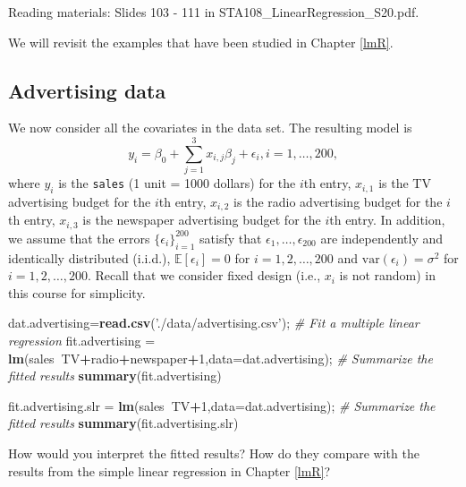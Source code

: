 \documentclass[12pt,]{book}
\newenvironment{Shaded}{\begin{snugshade}}{\end{snugshade}}
\newcommand{\KeywordTok}[1]{\textcolor[rgb]{0.13,0.29,0.53}{\textbf{#1}}}
\newcommand{\DataTypeTok}[1]{\textcolor[rgb]{0.13,0.29,0.53}{#1}}
\newcommand{\DecValTok}[1]{\textcolor[rgb]{0.00,0.00,0.81}{#1}}
\newcommand{\StringTok}[1]{\textcolor[rgb]{0.31,0.60,0.02}{#1}}
\newcommand{\CommentTok}[1]{\textcolor[rgb]{0.56,0.35,0.01}{\textit{#1}}}
\newcommand{\OperatorTok}[1]{\textcolor[rgb]{0.81,0.36,0.00}{\textbf{#1}}}
\newcommand{\NormalTok}[1]{#1}
\begin{document}
Reading materials: Slides 103 - 111 in
STA108\_LinearRegression\_S20.pdf.

We will revisit the examples that have been studied in Chapter
\ref{lmR}.

\subsection{Advertising data}\label{advertising-data-1}

We now consider all the covariates in the data set. The resulting model
is \[
    y_i =  \beta_0 + \sum_{j=1}^3 x_{i,j} \beta_j  +  \epsilon_i, i=1,\ldots, 200,
    \] where \(y_i\) is the \texttt{sales} (1 unit = 1000 dollars) for
the \(i\)th entry, \(x_{i,1}\) is the TV advertising budget for the
\(i\)th entry, \(x_{i,2}\) is the radio advertising budget for the
\(i\)th entry, \(x_{i,3}\) is the newspaper advertising budget for the
\(i\)th entry. In addition, we assume that the errors
\(\{\epsilon_i\}_{i=1}^{200}\) satisfy that
\(\epsilon_1,\ldots, \epsilon_200\) are independently and identically
distributed (i.i.d.), \(\mathbb{E}[\epsilon_i]= 0\) for
\(i=1,2,\ldots, 200\) and \(\mathrm{var}(\epsilon_i)=\sigma^2\) for
\(i=1,2,\ldots, 200\). Recall that we consider fixed design (i.e.,
\(x_i\) is not random) in this course for simplicity.

\begin{Shaded}
\begin{Highlighting}[]
\NormalTok{dat.advertising=}\KeywordTok{read.csv}\NormalTok{(}\StringTok{'./data/advertising.csv'}\NormalTok{);}
\CommentTok{# Fit a multiple linear regression}
\NormalTok{fit.advertising =}\StringTok{ }\KeywordTok{lm}\NormalTok{(sales}\OperatorTok{~}\NormalTok{TV}\OperatorTok{+}\NormalTok{radio}\OperatorTok{+}\NormalTok{newspaper}\OperatorTok{+}\DecValTok{1}\NormalTok{,}\DataTypeTok{data=}\NormalTok{dat.advertising); }
\CommentTok{# Summarize the fitted results}
\KeywordTok{summary}\NormalTok{(fit.advertising) }

\NormalTok{fit.advertising.slr =}\StringTok{ }\KeywordTok{lm}\NormalTok{(sales}\OperatorTok{~}\NormalTok{TV}\OperatorTok{+}\DecValTok{1}\NormalTok{,}\DataTypeTok{data=}\NormalTok{dat.advertising); }
\CommentTok{# Summarize the fitted results}
\KeywordTok{summary}\NormalTok{(fit.advertising.slr) }
\end{Highlighting}
\end{Shaded}

How would you interpret the fitted results? How do they compare with the
results from the simple linear regression in Chapter \ref{lmR}?
\end{document}
